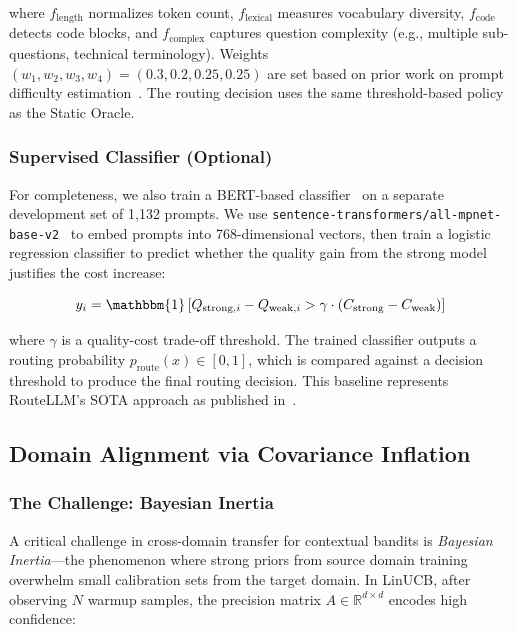 where $f_{\text{length}}$ normalizes token count, $f_{\text{lexical}}$ measures vocabulary diversity, $f_{\text{code}}$ detects code blocks, and $f_{\text{complex}}$ captures question complexity (e.g., multiple sub-questions, technical terminology). Weights $(w_1, w_2, w_3, w_4) = (0.3, 0.2, 0.25, 0.25)$ are set based on prior work on prompt difficulty estimation~\cite{openai2023gpt4,zheng2023judging}. The routing decision uses the same threshold-based policy as the Static Oracle.

\subsubsection{Supervised Classifier (Optional)}

For completeness, we also train a BERT-based classifier~\cite{devlin2019bert} on a separate development set of 1,132 prompts. We use \texttt{sentence-transformers/all-mpnet-base-v2}~\cite{reimers2019sentence} to embed prompts into 768-dimensional vectors, then train a logistic regression classifier to predict whether the quality gain from the strong model justifies the cost increase:

\begin{equation}
    y_i = \mathbbm{1}\left[ Q_{\text{strong},i} - Q_{\text{weak},i} > \gamma \cdot (C_{\text{strong}} - C_{\text{weak}}) \right]
\end{equation}

where $\gamma$ is a quality-cost trade-off threshold. The trained classifier outputs a routing probability $p_{\text{route}}(x) \in [0,1]$, which is compared against a decision threshold to produce the final routing decision. This baseline represents RouteLLM's SOTA approach as published in~\cite{ong2024routellm}.

\subsection{Domain Alignment via Covariance Inflation}
\label{sec:domain_alignment}

\subsubsection{The Challenge: Bayesian Inertia}

A critical challenge in cross-domain transfer for contextual bandits is \emph{Bayesian Inertia}—the phenomenon where strong priors from source domain training overwhelm small calibration sets from the target domain. In LinUCB, after observing $N$ warmup samples, the precision matrix $A \in \mathbb{R}^{d \times d}$ encodes high confidence:

